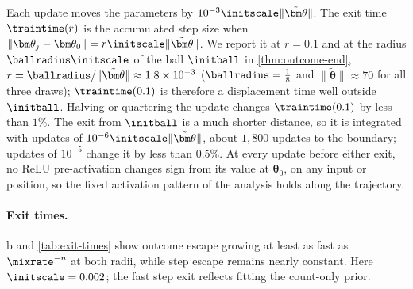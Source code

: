 Each update moves the parameters by $10^{-3}\initscale\|\tilde{\bm\theta}\|$.
The exit time $\traintime(r)$ is the accumulated step size when $\|\bm\theta_j-\bm\theta_0\|=r\initscale\|\tilde{\bm\theta}\|$. We report it at
$r=0.1$ and at the radius $\ballradius\initscale$ of the ball $\initball$ in \cref{thm:outcome-end}, $r=\ballradius/\|\tilde{\bm\theta}\|\approx1.8\times10^{-3}$
($\ballradius=\tfrac{1}{8}$ and $\|\tilde{\bm\theta}\|\approx70$ for all three draws); $\traintime(0.1)$ is therefore a displacement time well outside $\initball$.
Halving or quartering the update changes $\traintime(0.1)$ by less than $1\%$. The exit from $\initball$ is a much shorter distance, so
it is integrated with updates of $10^{-6}\initscale\|\tilde{\bm\theta}\|$, about $1{,}800$ updates to the boundary; updates of $10^{-5}$ change it by
less than $0.5\%$. At every update before either exit, no ReLU pre-activation
changes sign from its value at $\bm\theta_0$, on any input or position, so the fixed activation pattern of the analysis holds along the trajectory.

\paragraph{Exit times.} b and \cref{tab:exit-times} show outcome escape growing at least as fast as
$\mixrate^{-n}$ at both radii, while step escape remains nearly constant. Here $\initscale=0.002$; the fast step exit reflects fitting the
count-only prior.

\begin{table}[H]
\centering\small
{}
\caption{\textbf{Outcome escape grows exponentially while step escape stays nearly constant.} $\initscale=0.002$, zero readout;
ranges are over three draws.}
\label{tab:exit-times}
\end{table}
